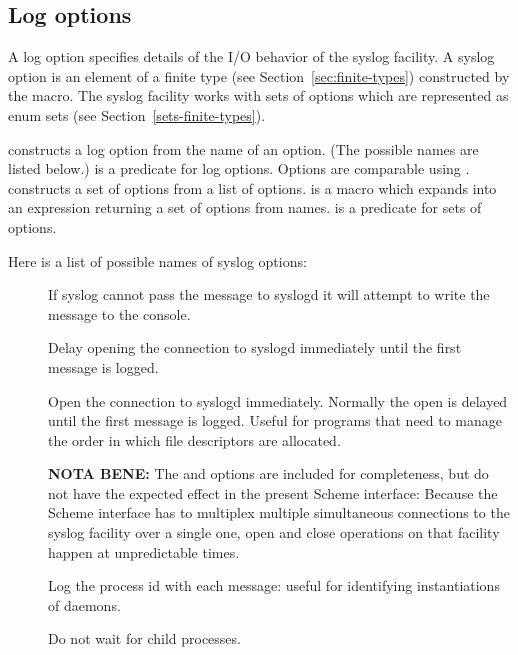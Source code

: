 \subsection*{Log options}

A log option specifies details of the I/O behavior of the syslog
facility.  A syslog option is an element of a finite type (see
Section~\ref{sec:finite-types}) constructed by the
 macro.  The syslog facility works with sets of
options which are represented as enum sets (see
Section~\ref{sets-finite-types}).

\begin{protos}
\end{protos}
\noindent
{} constructs a log option from the name of an
option.  (The possible names are listed below.)  
is a predicate for log options.  Options are comparable using
.   constructs a set of options
from a list of options.   is a macro which
expands into an expression returning a set of options from names.
 is a predicate for sets of options.

Here is a list of possible names of syslog options:

\begin{description}
\item[]
  If syslog cannot pass the message to syslogd it will attempt to
  write the message to the console.

\item[]
  Delay opening the connection to syslogd immediately until the first
  message is logged.

\item[]
  Open the connection to syslogd immediately.  Normally
  the open is delayed until the first message is logged.
  Useful for programs that need to manage the order in which
  file descriptors are allocated.

  \noindent\textbf{NOTA BENE:}
  The  and  options are included for
  completeness, but do not have the expected effect in the present
  Scheme interface: Because the Scheme interface has to multiplex
  multiple simultaneous connections to the syslog facility over a
  single one, open and close operations on that facility happen at
  unpredictable times.

\item[]
  Log the process id with each message: useful for identifying
  instantiations of daemons.

\item[]
  Do not wait for child processes.
\end{description}

